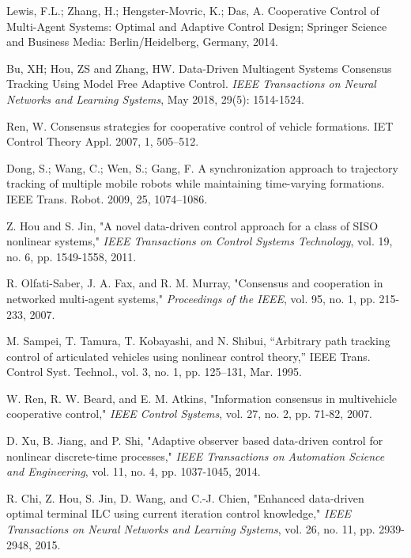 \documentclass[journal,onecolumn]{IEEEtran}
\begin{document}
\begin{thebibliography}{99}


    Lewis, F.L.; Zhang, H.; Hengster-Movric, K.; Das, A. Cooperative Control of Multi-Agent Systems: Optimal and Adaptive Control
    Design; Springer Science and Business Media: Berlin/Heidelberg, Germany, 2014.
    
    Bu, XH; Hou, ZS and Zhang, HW. Data-Driven Multiagent Systems Consensus Tracking Using Model Free Adaptive Control. \textit{IEEE Transactions on Neural Networks and Learning Systems}, May 2018, 29(5): 1514-1524.

    Ren, W. Consensus strategies for cooperative control of vehicle formations. IET Control Theory Appl. 2007, 1, 505–512.

    Dong, S.; Wang, C.; Wen, S.; Gang, F. A synchronization approach to trajectory tracking of multiple mobile robots while
    maintaining time-varying formations. IEEE Trans. Robot. 2009, 25, 1074–1086.
    
    Z. Hou and S. Jin, "A novel data-driven control approach for a class of SISO nonlinear systems," \textit{IEEE Transactions on Control Systems Technology}, vol. 19, no. 6, pp. 1549-1558, 2011.
    
    R. Olfati-Saber, J. A. Fax, and R. M. Murray, "Consensus and cooperation in networked multi-agent systems," \textit{Proceedings of the IEEE}, vol. 95, no. 1, pp. 215-233, 2007.
    
    M. Sampei, T. Tamura, T. Kobayashi, and N. Shibui, “Arbitrary path
    tracking control of articulated vehicles using nonlinear control theory,”
    IEEE Trans. Control Syst. Technol., vol. 3, no. 1, pp. 125–131, Mar. 1995.
    
    W. Ren, R. W. Beard, and E. M. Atkins, "Information consensus in multivehicle cooperative control," \textit{IEEE Control Systems}, vol. 27, no. 2, pp. 71-82, 2007.
    
    D. Xu, B. Jiang, and P. Shi, "Adaptive observer based data-driven control for nonlinear discrete-time processes," \textit{IEEE Transactions on Automation Science and Engineering}, vol. 11, no. 4, pp. 1037-1045, 2014.
    
    R. Chi, Z. Hou, S. Jin, D. Wang, and C.-J. Chien, "Enhanced data-driven optimal terminal ILC using current iteration control knowledge," \textit{IEEE Transactions on Neural Networks and Learning Systems}, vol. 26, no. 11, pp. 2939-2948, 2015.
    

\end{thebibliography}
\end{document}

